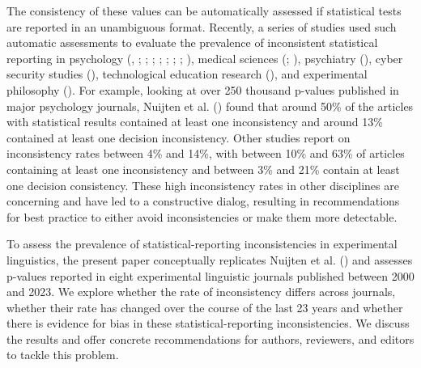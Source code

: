 \documentclass[
  doc,
  longtable,
  nolmodern,
  notxfonts,
  notimes,
  colorlinks=true,linkcolor=blue,citecolor=blue,urlcolor=blue]{apa7}
\begin{document}
The consistency of these values can be automatically assessed if
statistical tests are reported in an unambiguous format. Recently, a
series of studies used such automatic assessments to evaluate the
prevalence of inconsistent statistical reporting in psychology
(,
;
;
;
;
;
;
;
), medical
sciences (; ),
psychiatry (), cyber security studies (), technological education research
(), and
experimental philosophy (). For example, looking at over 250 thousand p-values
published in major psychology journals, Nuijten et al.
() found that around 50\% of
the articles with statistical results contained at least one
inconsistency and around 13\% contained at least one decision
inconsistency. Other studies report on inconsistency rates between 4\%
and 14\%, with between 10\% and 63\% of articles containing at least one
inconsistency and between 3\% and 21\% contain at least one decision
consistency. These high inconsistency rates in other disciplines are
concerning and have led to a constructive dialog, resulting in
recommendations for best practice to either avoid inconsistencies or
make them more detectable.

To assess the prevalence of statistical-reporting inconsistencies in
experimental linguistics, the present paper conceptually replicates
Nuijten et al. () and assesses
p-values reported in eight experimental linguistic journals published
between 2000 and 2023. We explore whether the rate of inconsistency
differs across journals, whether their rate has changed over the course
of the last 23 years and whether there is evidence for bias in these
statistical-reporting inconsistencies. We discuss the results and offer
concrete recommendations for authors, reviewers, and editors to tackle
this problem.
\end{document}
